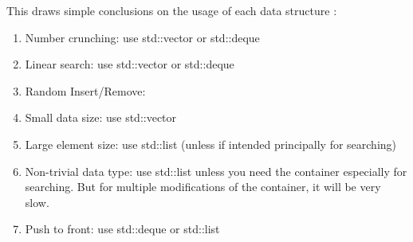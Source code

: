 This draws simple conclusions on the usage of each data structure \cite{Bulka2000,Josuttis1999a}: \vspace{-0.3cm}
\begin{enumerate} \itemsep -4pt
\item Number crunching: use std::vector or std::deque
\item Linear search: use std::vector or std::deque
\item Random Insert/Remove:
\item Small data size: use std::vector
\item Large element size: use std::list (unless if intended principally for searching)
\item Non-trivial data type: use std::list unless you need the container especially for searching. But for multiple modifications of the container, it will be very slow.
\item Push to front: use std::deque or std::list
\end{enumerate}

